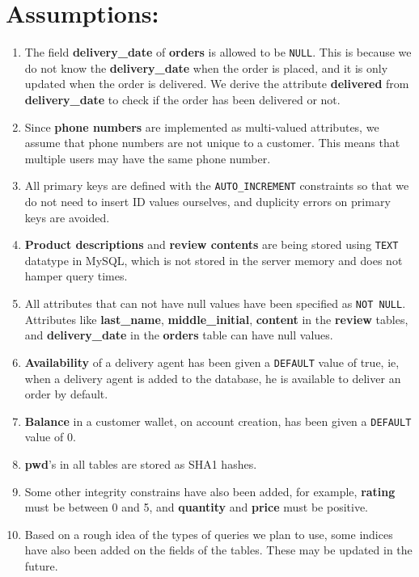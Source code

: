 \documentclass[12pt]{report}
\begin{document}
    \section*{Assumptions:}
    \begin{enumerate}
        \item
        The field \textbf{delivery\_date} of \textbf{orders} is allowed to be \texttt{NULL}.
        This is because we do not know the \textbf{delivery\_date} when the order is placed, and it is only updated when the order is delivered.
        We derive the attribute \textbf{delivered} from \textbf{delivery\_date} to check if the order has been delivered or not.
        \item
        Since \textbf{phone numbers} are implemented as multi-valued attributes, we assume that phone numbers are not unique to a customer.
        This means that multiple users may have the same phone number.
        \item
        All primary keys are defined with the \texttt{AUTO\_INCREMENT} constraints so that we do not need to insert ID values ourselves, and duplicity errors on primary keys are avoided.
        \item
        \textbf{Product descriptions} and \textbf{review contents} are being stored using \texttt{TEXT} datatype in MySQL, which is not stored in the server memory and does not hamper query times.
        \item
        All attributes that can not have null values have been specified as \texttt{NOT NULL}. Attributes like \textbf{last\_name}, \textbf{middle\_initial}, \textbf{content} in the \textbf{review} tables, and \textbf{delivery\_date} in the \textbf{orders} table can have null values.
        \item
        \textbf{Availability} of a delivery agent has been given a \texttt{DEFAULT} value of true, ie, when a delivery agent is added to the database, he is available to deliver an order by default.
        \item
        \textbf{Balance} in a customer wallet, on account creation, has been given a \texttt{DEFAULT} value of 0.
        \item
        \textbf{pwd}'s in all tables are stored as SHA1 hashes.
        \item
        Some other integrity constrains have also been added, for example, \textbf{rating} must be between 0 and 5, and \textbf{quantity} and \textbf{price} must be positive.
        \item
        Based on a rough idea of the types of queries we plan to use, some indices have also been added on the fields of the tables.
        These may be updated in the future.
    \end{enumerate}
\end{document}
